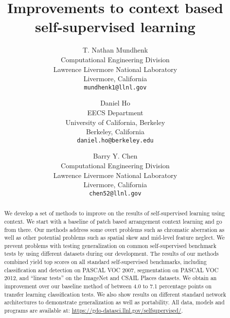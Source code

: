 \documentclass[10pt,twocolumn,letterpaper]{article}
\begin{document}
\title{Improvements to context based self-supervised learning}

\author{T. Nathan Mundhenk\\
Computational Engineering Division\\
Lawrence Livermore National Laboratory\\
Livermore, California\\
{\tt\small mundhenk1@llnl.gov}
\and
Daniel Ho\\
EECS Department\\
University of California, Berkeley\\
Berkeley, California\\
{\tt\small daniel.ho@berkeley.edu}
\and
Barry Y. Chen\\
Computational Engineering Division\\
Lawrence Livermore National Laboratory\\
Livermore, California\\
{\tt\small chen52@llnl.gov}
}

\maketitle


\begin{abstract}We develop a set of methods to improve on the results of self-supervised learning using context. We start with a baseline of patch based arrangement context learning and go from there. Our methods address some overt problems such as chromatic aberration as well as other potential problems such as spatial skew and mid-level feature neglect. We prevent problems with testing generalization on common self-supervised benchmark tests by using different datasets during our development. The results of our methods combined yield top scores on all standard self-supervised benchmarks, including classification and detection on PASCAL VOC 2007, segmentation on PASCAL VOC 2012, and ``linear tests'' on the ImageNet and CSAIL Places datasets. We obtain an improvement over our baseline method of between 4.0 to 7.1 percentage points on transfer learning classification tests. We also show results on different standard network architectures to demonstrate generalization as well as portability. All data, models and programs are available at: \url{https://gdo-datasci.llnl.gov/selfsupervised/}.     
\end{abstract}
\end{document}
